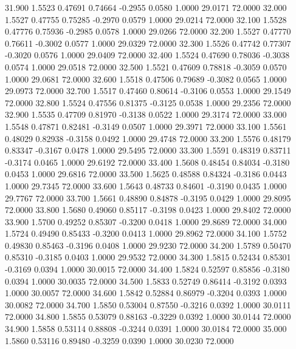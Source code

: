   31.900   1.5523   0.47691   0.74664  -0.2955   0.0580   1.0000  29.0171  72.0000
  32.000   1.5527   0.47755   0.75285  -0.2970   0.0579   1.0000  29.0214  72.0000
  32.100   1.5528   0.47776   0.75936  -0.2985   0.0578   1.0000  29.0266  72.0000
  32.200   1.5527   0.47770   0.76611  -0.3002   0.0577   1.0000  29.0329  72.0000
  32.300   1.5526   0.47742   0.77307  -0.3020   0.0576   1.0000  29.0409  72.0000
  32.400   1.5524   0.47690   0.78036  -0.3038   0.0574   1.0000  29.0518  72.0000
  32.500   1.5521   0.47609   0.78818  -0.3059   0.0570   1.0000  29.0681  72.0000
  32.600   1.5518   0.47506   0.79689  -0.3082   0.0565   1.0000  29.0973  72.0000
  32.700   1.5517   0.47460   0.80614  -0.3106   0.0553   1.0000  29.1549  72.0000
  32.800   1.5524   0.47556   0.81375  -0.3125   0.0538   1.0000  29.2356  72.0000
  32.900   1.5535   0.47709   0.81970  -0.3138   0.0522   1.0000  29.3174  72.0000
  33.000   1.5548   0.47871   0.82481  -0.3149   0.0507   1.0000  29.3971  72.0000
  33.100   1.5561   0.48029   0.82938  -0.3158   0.0492   1.0000  29.4748  72.0000
  33.200   1.5576   0.48179   0.83347  -0.3167   0.0478   1.0000  29.5495  72.0000
  33.300   1.5591   0.48319   0.83711  -0.3174   0.0465   1.0000  29.6192  72.0000
  33.400   1.5608   0.48454   0.84034  -0.3180   0.0453   1.0000  29.6816  72.0000
  33.500   1.5625   0.48588   0.84324  -0.3186   0.0443   1.0000  29.7345  72.0000
  33.600   1.5643   0.48733   0.84601  -0.3190   0.0435   1.0000  29.7767  72.0000
  33.700   1.5661   0.48890   0.84878  -0.3195   0.0429   1.0000  29.8095  72.0000
  33.800   1.5680   0.49060   0.85117  -0.3198   0.0423   1.0000  29.8402  72.0000
  33.900   1.5700   0.49252   0.85307  -0.3200   0.0418   1.0000  29.8689  72.0000
  34.000   1.5724   0.49490   0.85433  -0.3200   0.0413   1.0000  29.8962  72.0000
  34.100   1.5752   0.49830   0.85463  -0.3196   0.0408   1.0000  29.9230  72.0000
  34.200   1.5789   0.50470   0.85310  -0.3185   0.0403   1.0000  29.9532  72.0000
  34.300   1.5815   0.52434   0.85301  -0.3169   0.0394   1.0000  30.0015  72.0000
  34.400   1.5824   0.52597   0.85856  -0.3180   0.0394   1.0000  30.0035  72.0000
  34.500   1.5833   0.52749   0.86414  -0.3192   0.0393   1.0000  30.0057  72.0000
  34.600   1.5842   0.52884   0.86979  -0.3204   0.0393   1.0000  30.0082  72.0000
  34.700   1.5850   0.53004   0.87550  -0.3216   0.0392   1.0000  30.0111  72.0000
  34.800   1.5855   0.53079   0.88163  -0.3229   0.0392   1.0000  30.0144  72.0000
  34.900   1.5858   0.53114   0.88808  -0.3244   0.0391   1.0000  30.0184  72.0000
  35.000   1.5860   0.53116   0.89480  -0.3259   0.0390   1.0000  30.0230  72.0000
